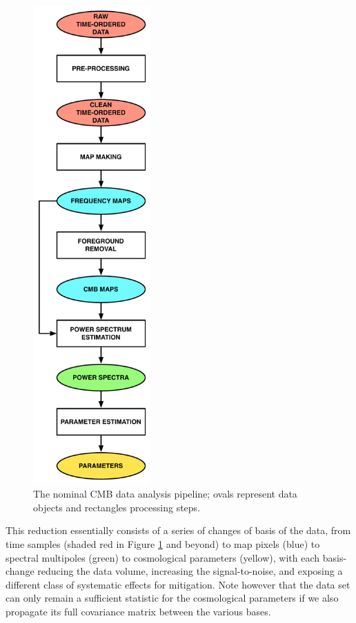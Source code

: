\begin{figure}[htbp]
\begin{minipage}[h]{0.4\linewidth}
\begin{center}
\includegraphics[width=0.4\textwidth]{Analysis/nda}
\caption{The nominal CMB data analysis pipeline; ovals represent data objects and rectangles processing steps.}
\label{fig_nda}
\end{center}
\end{minipage}
\end{figure}

This reduction essentially consists of a series of changes of basis of the data, from time samples (shaded red in Figure \ref{fig_nda} and beyond) to map pixels (blue) to spectral multipoles (green) to cosmological parameters (yellow), with each basis-change reducing the data volume, increasing the signal-to-noise, and exposing a different class of systematic effects for mitigation. Note however that the data set can only remain a sufficient statistic for the cosmological parameters if we also propagate its full covariance matrix between the various bases. 

